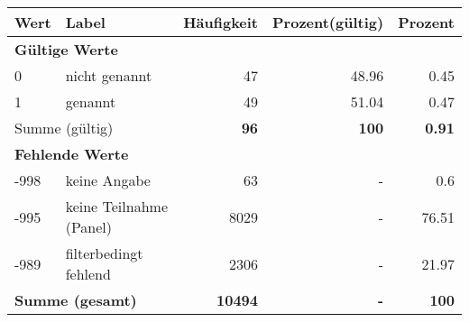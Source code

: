      \begin{longtable}{lXrrr}
     \toprule
     \textbf{Wert} & \textbf{Label} & \textbf{Häufigkeit} & \textbf{Prozent(gültig)} & \textbf{Prozent} \\
     \endhead
     \midrule
     \multicolumn{5}{l}{\textbf{Gültige Werte}}\\

     0 &
     \multicolumn{1}{X}{ nicht genannt   } &


       \num{47} &
       \num[round-mode=places,round-precision=2]{48,96} &
         \num[round-mode=places,round-precision=2]{0,45} \\

     1 &
     \multicolumn{1}{X}{ genannt   } &


       \num{49} &
       \num[round-mode=places,round-precision=2]{51,04} &
         \num[round-mode=places,round-precision=2]{0,47} \\
     \midrule
     \multicolumn{2}{l}{Summe (gültig)} &
       \textbf{\num{96}} &
     \textbf{100} &
       \textbf{\num[round-mode=places,round-precision=2]{0,91}} \\
     \multicolumn{5}{l}{\textbf{Fehlende Werte}}\\
       -998 &
       keine Angabe &
         \num{63} &
        - &
         \num[round-mode=places,round-precision=2]{0,6} \\
       -995 &
       keine Teilnahme (Panel) &
         \num{8029} &
        - &
         \num[round-mode=places,round-precision=2]{76,51} \\
       -989 &
       filterbedingt fehlend &
         \num{2306} &
        - &
         \num[round-mode=places,round-precision=2]{21,97} \\
     \midrule
     \multicolumn{2}{l}{\textbf{Summe (gesamt)}} &
          \textbf{\num{10494}} &
        \textbf{-} &
        \textbf{100} \\
     \bottomrule
     \end{longtable}
     

